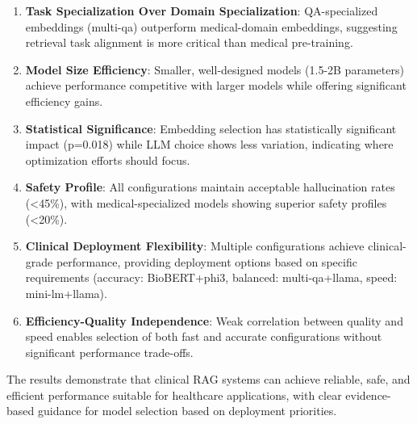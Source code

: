\begin{enumerate}
    \item \textbf{Task Specialization Over Domain Specialization}: QA-specialized embeddings (multi-qa) outperform medical-domain embeddings, suggesting retrieval task alignment is more critical than medical pre-training.

    \item \textbf{Model Size Efficiency}: Smaller, well-designed models (1.5-2B parameters) achieve performance competitive with larger models while offering significant efficiency gains.

    \item \textbf{Statistical Significance}: Embedding selection has statistically significant impact (p=0.018) while LLM choice shows less variation, indicating where optimization efforts should focus.

    \item \textbf{Safety Profile}: All configurations maintain acceptable hallucination rates (\textless45\%), with medical-specialized models showing superior safety profiles (\textless20\%).

    \item \textbf{Clinical Deployment Flexibility}: Multiple configurations achieve clinical-grade performance, providing deployment options based on specific requirements (accuracy: BioBERT+phi3, balanced: multi-qa+llama, speed: mini-lm+llama).

    \item \textbf{Efficiency-Quality Independence}: Weak correlation between quality and speed enables selection of both fast and accurate configurations without significant performance trade-offs.
\end{enumerate}

The results demonstrate that clinical RAG systems can achieve reliable, safe, and efficient performance suitable for healthcare applications, with clear evidence-based guidance for model selection based on deployment priorities.